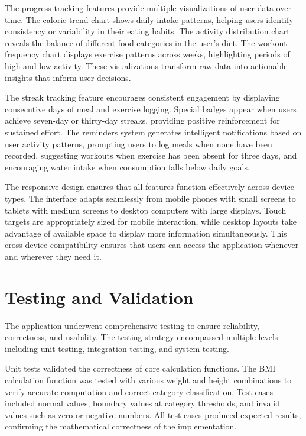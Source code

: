 The progress tracking features provide multiple visualizations of user data over time. The calorie trend chart shows daily intake patterns, helping users identify consistency or variability in their eating habits. The activity distribution chart reveals the balance of different food categories in the user's diet. The workout frequency chart displays exercise patterns across weeks, highlighting periods of high and low activity. These visualizations transform raw data into actionable insights that inform user decisions.

The streak tracking feature encourages consistent engagement by displaying consecutive days of meal and exercise logging. Special badges appear when users achieve seven-day or thirty-day streaks, providing positive reinforcement for sustained effort. The reminders system generates intelligent notifications based on user activity patterns, prompting users to log meals when none have been recorded, suggesting workouts when exercise has been absent for three days, and encouraging water intake when consumption falls below daily goals.

The responsive design ensures that all features function effectively across device types. The interface adapts seamlessly from mobile phones with small screens to tablets with medium screens to desktop computers with large displays. Touch targets are appropriately sized for mobile interaction, while desktop layouts take advantage of available space to display more information simultaneously. This cross-device compatibility ensures that users can access the application whenever and wherever they need it.

\section{Testing and Validation}

The application underwent comprehensive testing to ensure reliability, correctness, and usability. The testing strategy encompassed multiple levels including unit testing, integration testing, and system testing.

Unit tests validated the correctness of core calculation functions. The BMI calculation function was tested with various weight and height combinations to verify accurate computation and correct category classification. Test cases included normal values, boundary values at category thresholds, and invalid values such as zero or negative numbers. All test cases produced expected results, confirming the mathematical correctness of the implementation.

